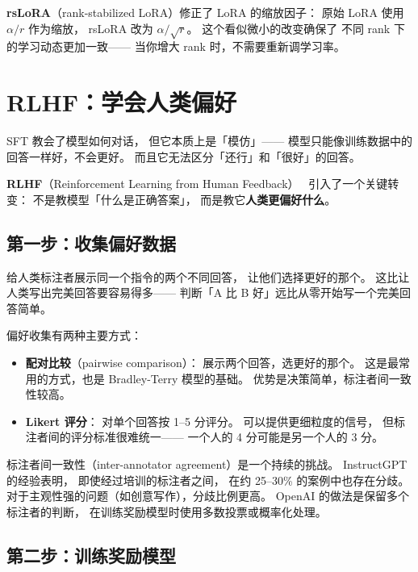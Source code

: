 
\textbf{rsLoRA}（rank-stabilized LoRA）修正了 LoRA 的缩放因子：
原始 LoRA 使用 $\alpha / r$ 作为缩放，
rsLoRA 改为 $\alpha / \sqrt{r}$。
这个看似微小的改变确保了
不同 rank 下的学习动态更加一致——
当你增大 rank 时，不需要重新调学习率。

\section{RLHF：学会人类偏好}

SFT 教会了模型如何对话，
但它本质上是「模仿」——
模型只能像训练数据中的回答一样好，不会更好。
而且它无法区分「还行」和「很好」的回答。

\textbf{RLHF}（Reinforcement Learning from Human Feedback）~\cite{ouyang2022rlhf}
引入了一个关键转变：
不是教模型「什么是正确答案」，
而是教它\textbf{人类更偏好什么}。

\subsection{第一步：收集偏好数据}

给人类标注者展示同一个指令的两个不同回答，
让他们选择更好的那个。
这比让人类写出完美回答要容易得多——
判断「A 比 B 好」远比从零开始写一个完美回答简单。

偏好收集有两种主要方式：
\begin{itemize}[noitemsep]
  \item \textbf{配对比较}（pairwise comparison）：
        展示两个回答，选更好的那个。
        这是最常用的方式，也是 Bradley-Terry 模型的基础。
        优势是决策简单，标注者间一致性较高。
  \item \textbf{Likert 评分}：
        对单个回答按 1--5 分评分。
        可以提供更细粒度的信号，
        但标注者间的评分标准很难统一——
        一个人的 4 分可能是另一个人的 3 分。
\end{itemize}

标注者间一致性（inter-annotator agreement）是一个持续的挑战。
InstructGPT 的经验表明，
即使经过培训的标注者之间，
在约 25--30\% 的案例中也存在分歧。
对于主观性强的问题（如创意写作），分歧比例更高。
OpenAI 的做法是保留多个标注者的判断，
在训练奖励模型时使用多数投票或概率化处理。

\subsection{第二步：训练奖励模型}

